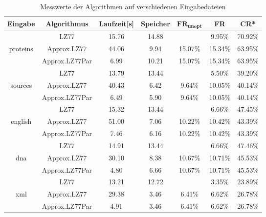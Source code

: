 \begin{table}[ht]
    \centering
    \caption{Messwerte der Algorithmen auf verschiedenen Eingabedateien}
    \label{messwerte}
    \begin{tabular} { |c|c|c|c|c|c|c| }
        \hline
        \textbf{Eingabe} & \textbf{Algorithmus} & \textbf{Laufzeit[s]} & \textbf{Speicher} & $\mathbf{FR_{unopt}}$ & \textbf{FR} & \textbf{CR*} \\
        \hline
        & LZ77 & 15.76 & 14.88 & & 9.95\% & 70.92\% \\
        proteins & Approx.LZ77 & 44.06 & 9.94 & 15.07\% & 15.34\% & 63.95\% \\
        & Approx.LZ77Par & 6.99 & 10.21 & 15.07\% & 15.34\% & 63.95\% \\
        \hline
        & LZ77 & 13.79 & 13.44 & & 5.50\% & 39.20\% \\
        sources & Approx.LZ77 & 40.43 & 6.42 & 9.64\% & 10.05\% & 40.14\% \\
        & Approx.LZ77Par & 6.49 & 5.90 & 9.64\% & 10.05\% & 40.14\% \\
        \hline
        & LZ77 & 15.32 & 13.44 & & 6.66\% & 47.45\% \\
        english & Approx.LZ77 & 51.00 & 7.06 & 10.22\% & 10.42\% & 43.39\% \\
        & Approx.LZ77Par & 7.46 & 6.16 & 10.22\% & 10.42\% & 43.39\% \\
        \hline
        & LZ77 & 14.91 & 13.44 & & 6.66\% & 47.46\% \\
        dna & Approx.LZ77 & 30.10 & 8.38 & 10.67\% & 10.71\% & 45.53\% \\
        & Approx.LZ77Par & 4.80 & 6.66 & 10.67\% & 10.71\% & 45.53\% \\
        \hline
        & LZ77 & 13.21 & 12.72 & & 3.35\% & 23.89\% \\
        xml & Approx.LZ77 & 29.38 & 3.46 & 6.41\% & 6.62\% & 26.78\% \\
        & Approx.LZ77Par & 4.91 & 3.46 & 6.41\% & 6.62\% & 26.78\% \\
        \hline
    \end{tabular}
\end{table}

